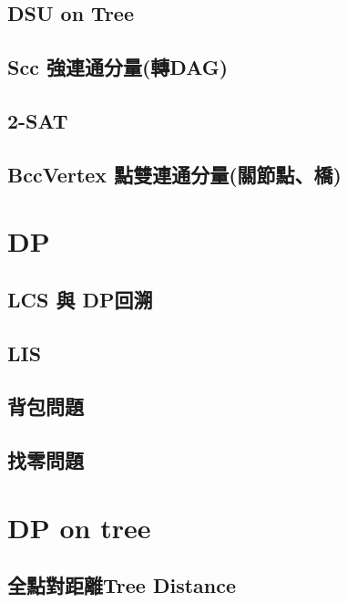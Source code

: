 \subsection{DSU on Tree}


\subsection{Scc 強連通分量(轉DAG)}


\subsection{2-SAT}


\subsection{BccVertex 點雙連通分量(關節點、橋)}


\section{DP}

\subsection{LCS 與 DP回溯}


\subsection{LIS}


\subsection{背包問題}


\subsection{找零問題}


\section{DP on tree}

\subsection{全點對距離Tree Distance}


